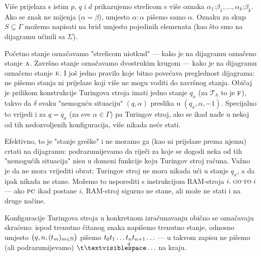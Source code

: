 \begin{primjer}[{name=[funkcija koja riječi parne duljine preslikava u prvu polovicu]}]
Više prijelaza s istim $p$, $q$ i $d$ prikazujemo strelicom s više oznaka $\alpha_1\mathord:\beta_1,\dotsc,\alpha_k\mathord:\beta_k$. Ako se znak ne mijenja ($\alpha=\beta$), umjesto $\alpha\!:\!\alpha$ pišemo samo $\alpha$. Oznaku za skup $S\subseteq\Gamma$ možemo napisati na brid umjesto pojedinih elemenata (kao što smo na dijagramu učinili sa $\Sigma$).

    Početno stanje označavamo "strelicom niotkud" --- kako je na dijagramu označeno stanje $\textsc a$. Završno stanje označavamo dvostrukim krugom --- kako je na dijagramu označeno stanje $\textsc e$. I još jedno pravilo koje bitno povećava preglednost dijagrama: ne pišemo stanja ni prijelaze koji više ne mogu voditi do završnog stanja. Običaj je prilikom konstrukcije Turingova stroja imati jedno stanje $q_x$ (za $\mathcal T_h$ to je $\textsc f$), takvo da $\delta$ svaku "nemoguću situaciju" $(q,\alpha)$ preslika u $(q_x,\alpha,-1)$. Specijalno to vrijedi i za $q=q_x$ (za sve $\alpha\in\Gamma$) pa Turingov stroj, ako se ikad nađe u nekoj od tih nedozvoljenih konfiguracija, više nikada neće stati.

    Efektivno, to je "stanje greške" i ne moramo ga (kao ni prijelaze prema njemu) crtati na dijagramu: podrazumijevamo da riječi za koje se dogodi neka od tih "nemogućih situacija" nisu u domeni funkcije koju Turingov stroj računa. Važno je da ne mora vrijediti obrat: Turingov stroj ne mora nikada ući u stanje $q_x$, a da ipak nikada ne stane. Možemo to usporediti s instrukcijom RAM-stroja $i.\;\textsc{go\,to}\;i$ --- ako $\textsc{pc}$ ikad postane $i$, RAM-stroj sigurno ne stane, ali može ne stati i na druge načine.

    Konfiguracije Turingova stroja u konkretnom izračunavanju obično se označavaju skraćeno: ispod trenutno čitanog znaka napišemo trenutno stanje, odnosno umjesto $\bigl(q,n,(t_m)_{m\in{\mathbb N}}\bigr)$ pišemo $t_0t_1\ldots\smash{\underset{q}{t_n}}t_{n+1}\ldots$ --- u takvom zapisu ne pišemo (ali podrazumijevamo) $\bl\ldots$ na kraju.


\end{primjer}
